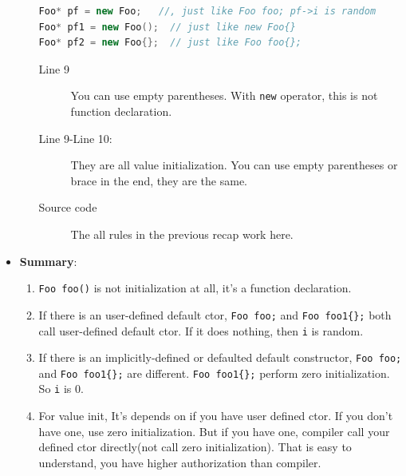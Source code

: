 \documentclass[a4paper,11pt,twoside]{book}
\begin{document}
\begin{itemize}
\begin{enumerate}
\begin{lstlisting}[frame=single, language=c++]
Foo* pf = new Foo;   //, just like Foo foo; pf->i is random 
Foo* pf1 = new Foo();  // just like new Foo{}
Foo* pf2 = new Foo{};  // just like Foo foo{};	
\end{lstlisting}	

\begin{description}			
	\item[Line 9] You can use empty parentheses. With \texttt{new} operator, this is not function declaration. 
	
	\item[Line 9-Line 10:] They are all value initialization. You can use empty parentheses or brace in the end, they are the same. 
	
	\item[Source code] The all rules in the previous recap work here. 
\end{description}		

	\end{enumerate}
		
\item \textbf{Summary}:
\begin{enumerate}
	\item \texttt{Foo foo()} is not initialization at all, it's a function declaration. 
	
	\item If there is an user-defined default ctor, \texttt{Foo foo;} and \texttt{Foo foo1\{\};} both call user-defined default ctor. If it does nothing, then \texttt{i} is random.
	
	\item If there is an implicitly-defined or defaulted default constructor, \texttt{Foo foo;} and \texttt{Foo foo1\{\};} are different. \texttt{Foo foo1\{\};} perform zero initialization. So \texttt{i} is 0. 
	
	\item For value init, It's depends on if you have user defined ctor. If you don't have one, use zero initialization. But if you have one, compiler call your defined ctor directly(not call zero initialization). That is easy to understand, you have higher authorization than compiler. 
\end{enumerate}

\end{itemize}
\end{document}

